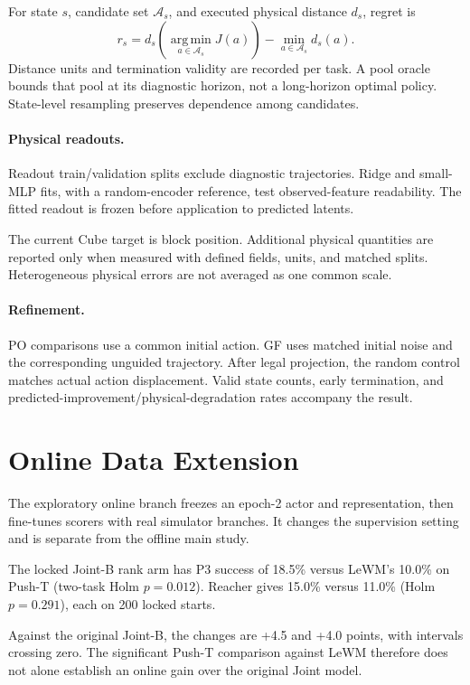 For state $s$, candidate set $\mathcal A_s$, and executed physical distance $d_s$, regret is
\begin{equation}
r_s=d_s\!\left(\operatorname*{arg\,min}_{a\in\mathcal A_s}J(a)\right)
-\min_{a\in\mathcal A_s}d_s(a).
\end{equation}
Distance units and termination validity are recorded per task. A pool oracle bounds that pool at its diagnostic horizon, not a long-horizon optimal policy. State-level resampling preserves dependence among candidates.

\paragraph{Physical readouts.}
Readout train/validation splits exclude diagnostic trajectories. Ridge and small-MLP fits, with a random-encoder reference, test observed-feature readability. The fitted readout is frozen before application to predicted latents.

The current Cube target is block position. Additional physical quantities are reported only when measured with defined fields, units, and matched splits. Heterogeneous physical errors are not averaged as one common scale.

\paragraph{Refinement.}
PO comparisons use a common initial action. GF uses matched initial noise and the corresponding unguided trajectory. After legal projection, the random control matches actual action displacement. Valid state counts, early termination, and predicted-improvement/physical-degradation rates accompany the result.

\section{Online Data Extension}
\label{app:online}
The exploratory online branch freezes an epoch-2 actor and representation, then fine-tunes scorers with real simulator branches. It changes the supervision setting and is separate from the offline main study.

The locked Joint-B rank arm has P3 success of 18.5\% versus LeWM's 10.0\% on Push-T (two-task Holm $p=0.012$). Reacher gives 15.0\% versus 11.0\% (Holm $p=0.291$), each on 200 locked starts.

Against the original Joint-B, the changes are +4.5 and +4.0 points, with intervals crossing zero. The significant Push-T comparison against LeWM therefore does not alone establish an online gain over the original Joint model.

